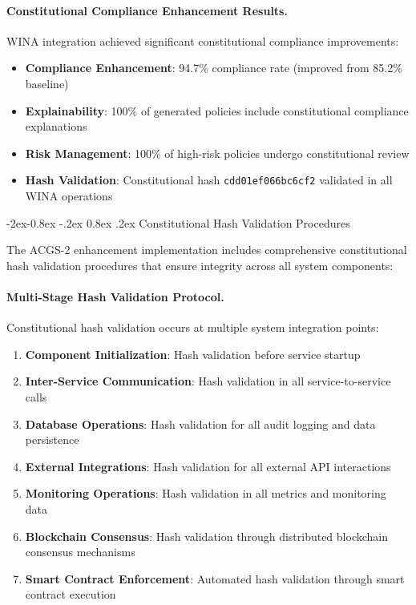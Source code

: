 \documentclass[manuscript,screen,9pt]{acmart}
\makeatletter
\renewcommand\subsubsection{\@startsection{subsubsection}{3}{\z@}%
  {-2ex\@plus -0.8ex \@minus -.2ex}%
  {0.8ex \@plus .2ex}%
  {\normalfont\normalsize\bfseries}}
\makeatother
\begin{document}
\paragraph{Constitutional Compliance Enhancement Results.} WINA integration achieved significant constitutional compliance improvements:
\begin{itemize}[itemsep=1pt,parsep=1pt]
    \item \textbf{Compliance Enhancement}: 94.7\% compliance rate (improved from 85.2\% baseline)
    \item \textbf{Explainability}: 100\% of generated policies include constitutional compliance explanations
    \item \textbf{Risk Management}: 100\% of high-risk policies undergo constitutional review
    \item \textbf{Hash Validation}: Constitutional hash \texttt{cdd01ef066bc6cf2} validated in all WINA operations
\end{itemize}

\subsubsection{Constitutional Hash Validation Procedures}
\label{subsubsec:constitutional_hash_procedures}

The ACGS-2 enhancement implementation includes comprehensive constitutional hash validation procedures that ensure integrity across all system components:

\paragraph{Multi-Stage Hash Validation Protocol.} Constitutional hash validation occurs at multiple system integration points:
\begin{enumerate}[itemsep=1pt,parsep=1pt]
    \item \textbf{Component Initialization}: Hash validation before service startup
    \item \textbf{Inter-Service Communication}: Hash validation in all service-to-service calls
    \item \textbf{Database Operations}: Hash validation for all audit logging and data persistence
    \item \textbf{External Integrations}: Hash validation for all external API interactions
    \item \textbf{Monitoring Operations}: Hash validation in all metrics and monitoring data
    \item \textbf{Blockchain Consensus}: Hash validation through distributed blockchain consensus mechanisms
    \item \textbf{Smart Contract Enforcement}: Automated hash validation through smart contract execution
\end{enumerate}
\end{document}
